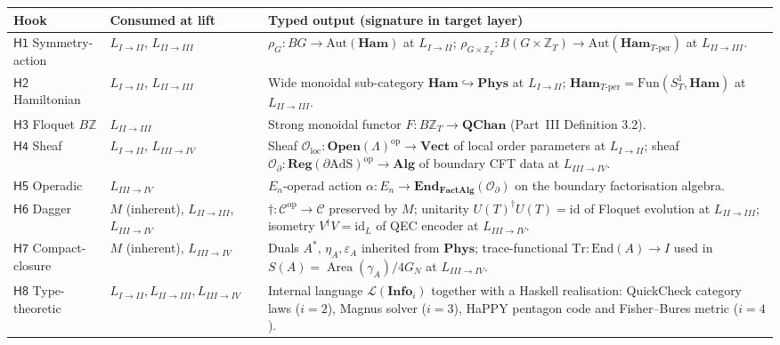\documentclass[12pt]{article}
\theoremstyle{definition}
\theoremstyle{remark}
\newcommand{\C}{\mathcal{C}}
\newcommand{\Phys}{\mathbf{Phys}}
\newcommand{\Info}{\mathbf{Info}}
\newcommand{\Vect}{\mathbf{Vect}}
\newcommand{\Ham}{\mathbf{Ham}}
\newcommand{\QChan}{\mathbf{QChan}}
\newcommand{\op}{\mathrm{op}}
\newcommand{\id}{\mathrm{id}}
\newcommand{\End}{\mathrm{End}}
\newcommand{\Tr}{\mathrm{Tr}}
\newcommand{\Area}{\operatorname{Area}}
\newcommand{\Z}{\mathbb{Z}}
\begin{document}
\begin{center}
\small
\renewcommand{\arraystretch}{1.18}
\begin{tabular}{@{}llp{7.5cm}@{}}
\toprule
Hook & Consumed at lift & Typed output (signature in target layer) \\
\midrule
$\mathsf{H1}$ Symmetry-action & $L_{I\to II}$, $L_{II\to III}$ &
  $\rho_G : BG \to \mathrm{Aut}(\Ham)$ at $L_{I\to II}$; $\rho_{G \times
  \Z_T} : B(G \times \Z_T) \to \mathrm{Aut}(\Ham_{T\text{-per}})$ at
  $L_{II\to III}$. \\
$\mathsf{H2}$ Hamiltonian & $L_{I\to II}$, $L_{II\to III}$ &
  Wide monoidal sub-category $\Ham \hookrightarrow \Phys$ at $L_{I\to
  II}$; $\Ham_{T\text{-per}} = \mathrm{Fun}(S^1_T, \Ham)$ at $L_{II\to
  III}$. \\
$\mathsf{H3}$ Floquet $B\Z$ & $L_{II\to III}$ &
  Strong monoidal functor $F : B\Z_T \to \QChan$ (Part~III
  Definition 3.2). \\
$\mathsf{H4}$ Sheaf & $L_{I\to II}$, $L_{III\to IV}$ &
  Sheaf $\mathcal{O}_{\mathrm{loc}} : \mathbf{Open}(\Lambda)^{\op} \to
  \Vect$ of local order parameters at $L_{I\to II}$; sheaf
  $\mathcal{O}_{\partial} : \mathbf{Reg}(\partial \mathrm{AdS})^{\op}
  \to \mathbf{Alg}$ of boundary CFT data at $L_{III\to IV}$. \\
$\mathsf{H5}$ Operadic & $L_{III\to IV}$ &
  $E_n$-operad action $\alpha : E_n \to \mathbf{End}_{\mathbf{FactAlg}}
  (\mathcal{O}_{\partial})$ on the boundary factorisation algebra. \\
$\mathsf{H6}$ Dagger & $M$ (inherent), $L_{II\to III}$, $L_{III\to IV}$ &
  $\dagger : \C^{\op} \to \C$ preserved by $M$; unitarity $U(T)^\dagger
  U(T) = \id$ of Floquet evolution at $L_{II\to III}$; isometry
  $V^\dagger V = \id_{L}$ of QEC encoder at $L_{III\to IV}$. \\
$\mathsf{H7}$ Compact-closure & $M$ (inherent), $L_{III\to IV}$ &
  Duals $A^*$, $\eta_A, \varepsilon_A$ inherited from $\Phys$;
  trace-functional $\Tr : \End(A) \to I$ used in
  $S(A) = \Area(\gamma_A) / 4G_N$ at $L_{III\to IV}$. \\
$\mathsf{H8}$ Type-theoretic & $L_{I\to II}, L_{II\to III}, L_{III\to IV}$ &
  Internal language $\mathcal{L}(\Info_i)$ together with a Haskell
  realisation: QuickCheck category laws ($i=2$), Magnus solver
  ($i=3$), HaPPY pentagon code and Fisher--Bures metric ($i=4$). \\
\bottomrule
\end{tabular}
\end{center}
\end{document}
